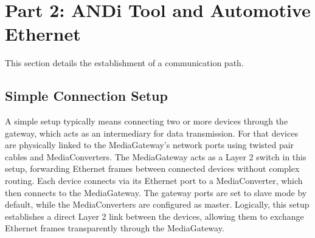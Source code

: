 \section{Part 2: ANDi Tool and Automotive Ethernet }
\label{sec:mediagateway}

This section details the establishment of a communication path.

\subsection{Simple Connection Setup}
A simple setup typically means connecting two or more devices through the gateway, which acts as an intermediary for data transmission. For that devices are physically linked to the MediaGateway’s network ports using twisted pair cables and MediaConverters. The MediaGateway acts as a Layer 2 switch in this setup, forwarding Ethernet frames between connected devices without complex routing. Each device connects via its Ethernet port to a MediaConverter, which then connects to the MediaGateway. The gateway ports are set to slave mode by default, while the MediaConverters are configured as master. Logically, this setup establishes a direct Layer 2 link between the devices, allowing them to exchange Ethernet frames transparently through the MediaGateway.

